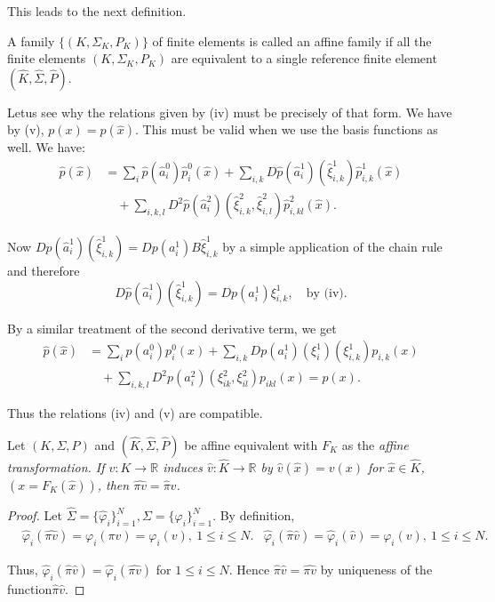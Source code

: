 This leads to the next definition.

\begin{definition}\label{chap5-defi5.4}
A family $\{(K,\Sigma_{K},P_{K})\}$ of finite elements is called an
affine family if all the finite elements $(K,\Sigma_{K},P_{K})$ are
equivalent to a single reference finite element
$(\hat{K},\hat{\Sigma},\hat{P})$. 
\end{definition}

Let\pageoriginale us see why the relations given by (iv) must be
precisely of that form. We have by (v), $p(x)=\hat{p}(\hat{x})$. This
must be valid when we use the basis functions as well. We have:
\begin{align*}
\hat{p}(\hat{x}) &=
\sum_{i}\hat{p}(\hat{a}^{0}_{i})\hat{p}^{0}_{i}(\hat{x})+\sum_{i,k}D\hat{p}(\hat{a}^{1}_{i})(\hat{\xi}^{1}_{i,k})\hat{p}^{1}_{i,k}(\hat{x})\\ 
&\quad
+\sum_{i,k,l}D^{2}\hat{p}(\hat{a}^{2}_{i})(\hat{\xi}^{2}_{i,k},\hat{\xi}^{2}_{i,l})\hat{p}^{2}_{i,kl}(\hat{x}). 
\end{align*}

Now
$D\hat{p}(\hat{a}^{1}_{i})(\hat{\xi}^{1}_{i,k})=Dp(a^{1}_{i})B\hat{\xi}^{1}_{i,k}$
by a simple application of the chain rule and therefore
$$
D\hat{p}(\hat{a}^{1}_{i})(\hat{\xi}^{1}_{i,k})=Dp(a^{1}_{i})\xi^{1}_{i,k},\quad\text{by
  (iv)}. 
$$

By a similar treatment of the second derivative term, we get
\begin{align*}
\hat{p}(\hat{x}) &=
\sum_{i}p(a^{0}_{i})p^{0}_{i}(x)+\sum_{i,k}Dp(a^{1}_{i})(\xi^{1}_{i})(\xi^{1}_{i,k})p_{i,k}(x)\\ 
&\quad + \sum_{i,k,l}D^{2}p(a^{2}_{i})
(\xi^{2}_{ik},\xi^{2}_{il})p_{ikl}(x)=p(x). 
\end{align*}

Thus the relations (iv) and (v) are compatible.

\begin{theorem}\label{chap5-thm5.1}
Let $(K,\Sigma,P)$ and $(\hat{K},\hat{\Sigma},\hat{P})$ be affine
equivalent with $F_{K}$ as the {\em affine transformation. If $v:K\to
\mathbb{R}$ induces $\hat{v}:\hat{K}\to \mathbb{R}$ by
$\hat{v}(\hat{x})=v(x)$ for $\hat{x}\in\hat{K}$, $(x=F_{K}(\hat{x}))$,
then $\widehat{\pi v}=\hat{\pi}\hat{v}$.}
\end{theorem}

\begin{proof}
Let
$\hat{\Sigma}=\{\hat{\varphi}_{i}\}^{N}_{i=1},\Sigma=\{\varphi_{i}\}^{N}_{i=1}$. By
definition, 
\begin{align*}
& \hat{\varphi}_{i}(\widehat{\pi v})=\varphi_{i}(\pi
v)=\varphi_{i}(v),\ 1\leq i\leq N.
&
\hat{\varphi}_{i}(\hat{\pi}\hat{v})=\hat{\varphi}_{i}(\hat{v})=\varphi_{i}(v),\ 1\leq
i\leq N.
\end{align*}

Thus,
$\hat{\varphi}_{i}(\hat{\pi}\hat{v})=\hat{\varphi}_{i}(\widehat{\pi
  v})$ for $1\leq i\leq N$. Hence $\hat{\pi}\hat{v}=\widehat{\pi v}$
by uniqueness of the function\pageoriginale $\hat{\pi}\hat{v}$.
\end{proof}

